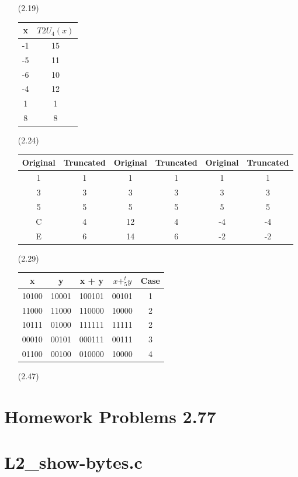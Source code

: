 \documentclass[11pt]{article}
\begin{document}
\begin{enumerate}
        \item[(2.19)]
            \begin{tabular}{||c | c||} 
            \hline
            x & $T2U_4(x)$ \\ [0.5ex] 
            \hline\hline
            -1 & 15  \\ 
            \hline
            -5 & 11 \\
            \hline
            -6 & 10 \\
            \hline
            -4 & 12 \\
            \hline
            1 & 1 \\
            \hline
            8 & 8 \\ 
            \hline
            \end{tabular}
        \item[(2.24)]
            \begin{tabular}{||c | c || c | c || c | c||} 
            \hline
            Original & Truncated & Original & Truncated & Original & Truncated \\ [0.5ex] 
            \hline\hline
            1 & 1  & 1 & 1 & 1 & 1\\ 
            \hline
            3 & 3 & 3 & 3 & 3 & 3\\
            \hline
            5 & 5 & 5 & 5 & 5 & 5\\
            \hline
            C & 4 & 12 & 4 & -4 & -4\\
            \hline
            E & 6 & 14 & 6 & -2 & -2\\
            \hline
            \end{tabular}
        \item[(2.29)]
        \begin{tabular}{||c | c | c | c | c ||} 
            \hline
            x & y & x + y & $x +^t_5 y$ & Case \\ [0.5ex] 
            \hline\hline
            10100 & 10001  & 100101 & 00101 &  1\\ 
            \hline
            11000 & 11000 & 110000 & 10000 &  2\\
            \hline
            10111 & 01000 & 111111 & 11111 &  2\\
            \hline
            00010 & 00101 & 000111 & 00111 & 3\\
            \hline
            01100 & 00100 & 010000 & 10000 &  4\\
            \hline
            \end{tabular}
        \item[(2.47)]     
    \end{enumerate}


\section{Homework Problems 2.77}

\section{L2\_show-bytes.c}
\end{document}
